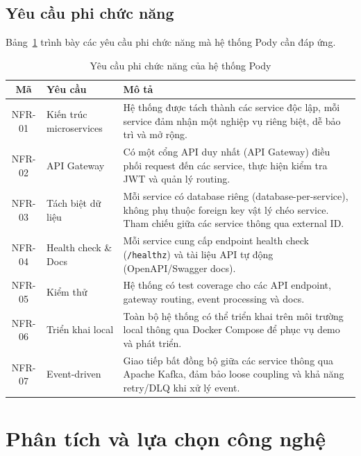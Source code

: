 \documentclass[14pt,a4paper,oneside]{extreport}
\begin{document}
\subsection{Yêu cầu phi chức năng}
\label{subsec:yeu-cau-pcn}

Bảng~\ref{tab:yeu-cau-pcn} trình bày các yêu cầu phi chức năng mà hệ thống Pody cần đáp ứng.

\begin{table}[H]
\centering
\caption{Yêu cầu phi chức năng của hệ thống Pody}
\label{tab:yeu-cau-pcn}
\renewcommand{\arraystretch}{1.3}
\small
\begin{tabularx}{\textwidth}{|c|l|X|}
\hline
\textbf{Mã} & \textbf{Yêu cầu} & \textbf{Mô tả} \\
\hline
NFR-01 & Kiến trúc microservices &
  Hệ thống được tách thành các service độc lập, mỗi service đảm nhận một nghiệp vụ riêng biệt, dễ bảo trì và mở rộng. \\
\hline
NFR-02 & API Gateway &
  Có một cổng API duy nhất (API Gateway) điều phối request đến các service, thực hiện kiểm tra JWT và quản lý routing. \\
\hline
NFR-03 & Tách biệt dữ liệu &
  Mỗi service có database riêng (database-per-service), không phụ thuộc foreign key vật lý chéo service. Tham chiếu giữa các service thông qua external ID. \\
\hline
NFR-04 & Health check \& Docs &
  Mỗi service cung cấp endpoint health check (\texttt{/healthz}) và tài liệu API tự động (OpenAPI/Swagger docs). \\
\hline
NFR-05 & Kiểm thử &
  Hệ thống có test coverage cho các API endpoint, gateway routing, event processing và docs. \\
\hline
NFR-06 & Triển khai local &
  Toàn bộ hệ thống có thể triển khai trên môi trường local thông qua Docker Compose để phục vụ demo và phát triển. \\
\hline
NFR-07 & Event-driven &
  Giao tiếp bất đồng bộ giữa các service thông qua Apache Kafka, đảm bảo loose coupling và khả năng retry/DLQ khi xử lý event. \\
\hline
\end{tabularx}
\end{table}

\section{Phân tích và lựa chọn công nghệ}
\label{sec:cong-nghe}
\end{document}
